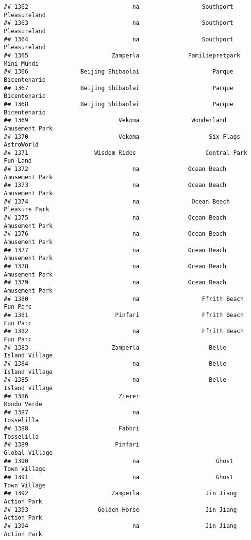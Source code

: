 \documentclass[
]{article}
\begin{document}
\begin{verbatim}
## 1362                              na                  Southport Pleasureland
## 1363                              na                  Southport Pleasureland
## 1364                              na                  Southport Pleasureland
## 1365                        Zamperla              Familiepretpark Mini Mundi
## 1366               Beijing Shibaolai                     Parque Bicentenario
## 1367               Beijing Shibaolai                     Parque Bicentenario
## 1368               Beijing Shibaolai                     Parque Bicentenario
## 1369                          Vekoma               Wonderland Amusement Park
## 1370                          Vekoma                    Six Flags AstroWorld
## 1371                   Wisdom Rides                    Central Park Fun-Land
## 1372                              na              Ocean Beach Amusement Park
## 1373                              na              Ocean Beach Amusement Park
## 1374                              na               Ocean Beach Pleasure Park
## 1375                              na              Ocean Beach Amusement Park
## 1376                              na              Ocean Beach Amusement Park
## 1377                              na              Ocean Beach Amusement Park
## 1378                              na              Ocean Beach Amusement Park
## 1379                              na              Ocean Beach Amusement Park
## 1380                              na                  Ffrith Beach Fun Parc 
## 1381                         Pinfari                  Ffrith Beach Fun Parc 
## 1382                              na                  Ffrith Beach Fun Parc 
## 1383                        Zamperla                    Belle Island Village
## 1384                              na                    Belle Island Village
## 1385                              na                    Belle Island Village
## 1386                          Zierer                             Mondo Verde
## 1387                              na                              Tosselilla
## 1388                          Fabbri                              Tosselilla
## 1389                         Pinfari                          Global Village
## 1390                              na                      Ghost Town Village
## 1391                              na                      Ghost Town Village
## 1392                        Zamperla                   Jin Jiang Action Park
## 1393                    Golden Horse                   Jin Jiang Action Park
## 1394                              na                   Jin Jiang Action Park

\end{verbatim}
\end{document}
